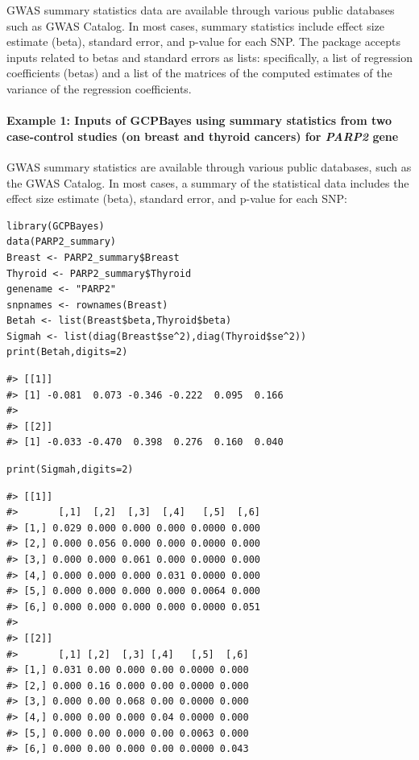 GWAS summary statistics data are available through various public databases such as GWAS Catalog.
In most cases, summary statistics include effect size estimate (beta), standard error, and p-value for each SNP.
The  package accepts inputs related to betas and standard errors as lists:
specifically, a list of regression coefficients (betas) and a list of the matrices of the computed estimates of the variance of the regression coefficients.

\hypertarget{example-1-inputs-of-gcpbayes-using-summary-statistics-from-two-case-control-studies-on-breast-and-thyroid-cancers-for-parp2-gene}{%
\paragraph{\texorpdfstring{Example 1: Inputs of GCPBayes using summary statistics from two case-control studies (on breast and thyroid cancers) for \emph{PARP2} gene}{Example 1: Inputs of GCPBayes using summary statistics from two case-control studies (on breast and thyroid cancers) for PARP2 gene}}\label{example-1-inputs-of-gcpbayes-using-summary-statistics-from-two-case-control-studies-on-breast-and-thyroid-cancers-for-parp2-gene}}

GWAS summary statistics are available through various public databases, such as the GWAS Catalog. In most cases, a summary of the statistical data includes the effect size estimate (beta), standard error, and p-value for each SNP:

\begin{verbatim}
library(GCPBayes)
data(PARP2_summary)
Breast <- PARP2_summary$Breast
Thyroid <- PARP2_summary$Thyroid
genename <- "PARP2"
snpnames <- rownames(Breast)
Betah <- list(Breast$beta,Thyroid$beta)
Sigmah <- list(diag(Breast$se^2),diag(Thyroid$se^2))
print(Betah,digits=2)
\end{verbatim}

\begin{verbatim}
#> [[1]]
#> [1] -0.081  0.073 -0.346 -0.222  0.095  0.166
#> 
#> [[2]]
#> [1] -0.033 -0.470  0.398  0.276  0.160  0.040
\end{verbatim}

\begin{verbatim}
print(Sigmah,digits=2)
\end{verbatim}

\begin{verbatim}
#> [[1]]
#>       [,1]  [,2]  [,3]  [,4]   [,5]  [,6]
#> [1,] 0.029 0.000 0.000 0.000 0.0000 0.000
#> [2,] 0.000 0.056 0.000 0.000 0.0000 0.000
#> [3,] 0.000 0.000 0.061 0.000 0.0000 0.000
#> [4,] 0.000 0.000 0.000 0.031 0.0000 0.000
#> [5,] 0.000 0.000 0.000 0.000 0.0064 0.000
#> [6,] 0.000 0.000 0.000 0.000 0.0000 0.051
#> 
#> [[2]]
#>       [,1] [,2]  [,3] [,4]   [,5]  [,6]
#> [1,] 0.031 0.00 0.000 0.00 0.0000 0.000
#> [2,] 0.000 0.16 0.000 0.00 0.0000 0.000
#> [3,] 0.000 0.00 0.068 0.00 0.0000 0.000
#> [4,] 0.000 0.00 0.000 0.04 0.0000 0.000
#> [5,] 0.000 0.00 0.000 0.00 0.0063 0.000
#> [6,] 0.000 0.00 0.000 0.00 0.0000 0.043
\end{verbatim}

